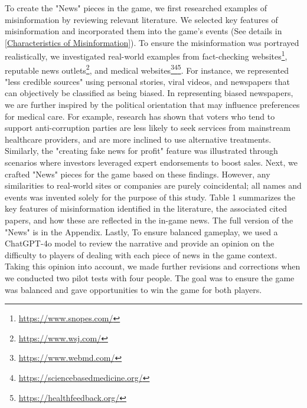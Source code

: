 To create the "News" pieces in the game, we first researched examples of misinformation by reviewing relevant literature. We selected key features of misinformation and incorporated them into the game's events (See details in \ref{Characteristics of Misinformation}). To ensure the misinformation was portrayed realistically, we investigated real-world examples from fact-checking websites\footnote{\url{https://www.snopes.com/}}, reputable news outlets\footnote{\url{https://www.wsj.com/}}, and medical websites\footnote{\url{https://www.webmd.com/}}\footnote{\url{https://sciencebasedmedicine.org/}}\footnote{\url{https://healthfeedback.org/}}. For instance, we represented "less credible sources" using personal stories, viral videos, and newspapers that can objectively be classified as being biased. In representing biased newspapers, we are further inspired by the political orientation that may influence preferences for medical care. For example, research has shown that voters who tend to support anti-corruption parties are less likely to seek services from mainstream healthcare providers, and are more inclined to use alternative treatments\cite{valtonen2023political}. Similarly, the "creating fake news for profit" feature was illustrated through scenarios where investors leveraged expert endorsements to boost sales. Next, we crafted "News" pieces for the game based on these findings. However, any similarities to real-world sites or companies are purely coincidental; all names and events was invented solely for the purpose of this study. Table 1 summarizes the key features of misinformation identified in the literature, the associated cited papers, and how these are reflected in the in-game news. The full version of the "News" is in the Appendix. Lastly, To ensure balanced gameplay, we used a ChatGPT-4o model to review the narrative and provide an opinion on the difficulty to players of dealing with each piece of news in the game context. Taking this opinion into account, we made further revisions and corrections when we conducted two pilot tests with four people. The goal was to ensure the game was balanced and gave opportunities to win the game for both players.


